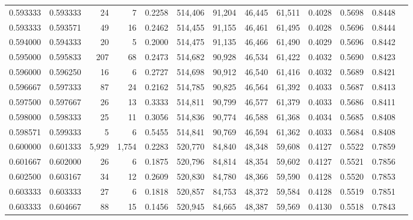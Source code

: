 \begin{tabular}{rrrrrrrrrrrrr}
0.593333 & 0.593333 &     24 &     7 &                                     0.2258 & 514,406 &  91,204 &  46,445 &  61,511 & 0.4028 & 0.5698 & 0.8448 \\
0.593333 & 0.593571 &     49 &    16 &                                     0.2462 & 514,455 &  91,155 &  46,461 &  61,495 & 0.4028 & 0.5696 & 0.8444 \\
0.594000 & 0.594333 &     20 &     5 &                                     0.2000 & 514,475 &  91,135 &  46,466 &  61,490 & 0.4029 & 0.5696 & 0.8442 \\
0.595000 & 0.595833 &    207 &    68 &                                     0.2473 & 514,682 &  90,928 &  46,534 &  61,422 & 0.4032 & 0.5690 & 0.8423 \\
0.596000 & 0.596250 &     16 &     6 &                                     0.2727 & 514,698 &  90,912 &  46,540 &  61,416 & 0.4032 & 0.5689 & 0.8421 \\
0.596667 & 0.597333 &     87 &    24 &                                     0.2162 & 514,785 &  90,825 &  46,564 &  61,392 & 0.4033 & 0.5687 & 0.8413 \\
0.597500 & 0.597667 &     26 &    13 &                                     0.3333 & 514,811 &  90,799 &  46,577 &  61,379 & 0.4033 & 0.5686 & 0.8411 \\
0.598000 & 0.598333 &     25 &    11 &                                     0.3056 & 514,836 &  90,774 &  46,588 &  61,368 & 0.4034 & 0.5685 & 0.8408 \\
0.598571 & 0.599333 &      5 &     6 &                                     0.5455 & 514,841 &  90,769 &  46,594 &  61,362 & 0.4033 & 0.5684 & 0.8408 \\
0.600000 & 0.601333 &  5,929 & 1,754 &                                     0.2283 & 520,770 &  84,840 &  48,348 &  59,608 & 0.4127 & 0.5522 & 0.7859 \\
0.601667 & 0.602000 &     26 &     6 &                                     0.1875 & 520,796 &  84,814 &  48,354 &  59,602 & 0.4127 & 0.5521 & 0.7856 \\
0.602500 & 0.603167 &     34 &    12 &                                     0.2609 & 520,830 &  84,780 &  48,366 &  59,590 & 0.4128 & 0.5520 & 0.7853 \\
0.603333 & 0.603333 &     27 &     6 &                                     0.1818 & 520,857 &  84,753 &  48,372 &  59,584 & 0.4128 & 0.5519 & 0.7851 \\
0.603333 & 0.604667 &     88 &    15 &                                     0.1456 & 520,945 &  84,665 &  48,387 &  59,569 & 0.4130 & 0.5518 & 0.7843 \\

\end{tabular}

